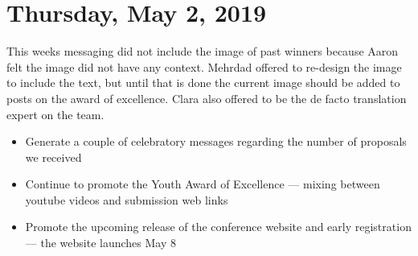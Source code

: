 \documentclass[12pt]{amsart}
\begin{document}
\section{Thursday, May 2, 2019}\label{mtg06}%
This weeks messaging did not include the image of past winners because Aaron felt the image did not have any context.
Mehrdad offered to re-design the image to include the text, but until that is done the current image should be added to posts on the award of excellence.
Clara also offered to be the de facto translation expert on the team.
\begin{itemize}
\item Generate a couple of celebratory messages regarding the number of proposals we received
\item Continue to promote the Youth Award of Excellence --- mixing between youtube videos and submission web links
\item Promote the upcoming release of the conference website and early registration --- the website launches May 8
\end{itemize}
\end{document}
